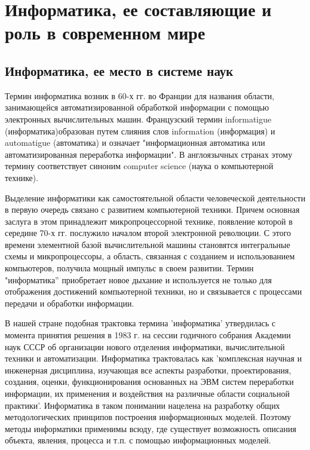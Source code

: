 \documentclass[a4paper]{article}
\begin{document}
\section{Информатика, ее составляющие и роль в современном мире}

\subsection{Информатика, ее место в системе наук}

Термин информатика возник в 60-х гг. во Франции для названия области, занимающейся автоматизированной обработкой информации с помощью электронных вычислительных машин. Французский термин informatigue (информатика)образован путем слияния слов information (информация) и automatigue (автоматика) и означает "информационная автоматика или автоматизированная переработка информации". В англоязычных странах этому термину соответствует синоним computer science (наука о компьютерной технике).

Выделение информатики как самостоятельной области человеческой деятельности в первую очередь связано с развитием компьютерной техники. Причем основная заслуга в этом принадлежит микропроцессорной технике, появление которой в середине 70-х гг. послужило началом второй электронной революции. С этого времени элементной базой вычислительной машины становятся интегральные схемы и микропроцессоры, а область, связанная с созданием и использованием компьютеров, получила мощный импульс в своем развитии. Термин "информатика'' приобретает новое дыхание и используется не только для отображения достижений компьютерной техники, но и связывается с процессами передачи и обработки информации.

В нашей стране подобная трактовка термина 'информатика' утвердилась с момента принятия решения в 1983 г. на сессии годичного собрания Академии наук СССР об организации нового отделения информатики, вычислительной техники и автоматизации. Информатика трактовалась как 'комплексная научная и инженерная дисциплина, изучающая все аспекты разработки, проектирования, создания, оценки, функционирования основанных на ЭВМ систем переработки информации, их применения и воздействия на различные области социальной практики'. Информатика в таком понимании нацелена на разработку общих методологических принципов построения информационных моделей. Поэтому методы информатики применимы всюду, где существует возможность описания объекта, явления, процесса и т.п. с помощью информационных моделей.
\end{document}
